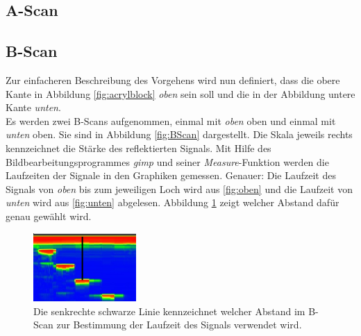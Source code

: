 \subsection{A-Scan\label{sec:AScan}}
\subsection{B-Scan}
Zur einfacheren Beschreibung des Vorgehens wird nun definiert, dass die obere Kante in Abbildung \ref{fig:acrylblock} \emph{oben} sein soll und die in der Abbildung untere Kante \emph{unten}. \\
Es werden zwei B-Scans aufgenommen, einmal mit \emph{oben} oben und einmal mit \emph{unten} oben. Sie sind in Abbildung \ref{fig:BScan} dargestellt. Die Skala jeweils rechts kennzeichnet die Stärke des reflektierten Signals. Mit Hilfe des Bildbearbeitungsprogrammes \emph{gimp} und seiner \emph{Measure}-Funktion werden die Laufzeiten der Signale in den Graphiken gemessen. Genauer: Die Laufzeit des Signals von \emph{oben} bis zum jeweiligen Loch wird aus \ref{fig:oben} und die Laufzeit von \emph{unten} wird aus \ref{fig:unten} abgelesen. Abbildung \ref{fig:Schema} zeigt welcher Abstand dafür genau gewählt wird.
\begin{figure}[h!]
	\centering
	\includegraphics[width=0.35\textwidth]{Schema.png}
	\caption{Die senkrechte schwarze Linie kennzeichnet welcher Abstand im B-Scan zur Bestimmung der Laufzeit des Signals verwendet wird.}
	\label{fig:Schema}
\end{figure} \\
